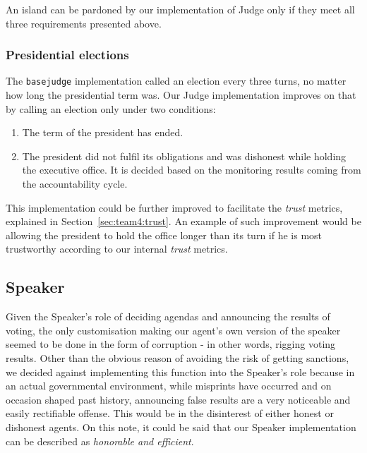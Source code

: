 An island can be pardoned by our implementation of Judge only if they meet all three requirements presented above. 


\subsubsection{Presidential elections}
The \texttt{basejudge} implementation called an election every three turns, no matter how long the presidential term was. Our Judge implementation improves on that by calling an election only under two conditions:
\begin{enumerate}
    \item The term of the president has ended.
    \item The president did not fulfil its obligations and was dishonest while holding the executive office. It is decided based on the monitoring results coming from the accountability cycle.
\end{enumerate}

This implementation could be further improved to facilitate the \emph{trust} metrics, explained in Section~\ref{sec:team4:trust}. An example of such improvement would be allowing the president to hold the office longer than its turn if he is most trustworthy according to our internal \emph{trust} metrics.

\subsection{Speaker}
Given the Speaker's role of deciding agendas and announcing the results of voting, the only customisation making our agent's own version of the speaker seemed to be done in the form of corruption - in other words, rigging voting results. Other than the obvious reason of avoiding the risk of getting sanctions, we decided against implementing this function into the Speaker's role because in an actual governmental environment, while misprints have occurred and on occasion shaped past history, announcing false results are a very noticeable and easily rectifiable offense. This would be in the disinterest of either honest or dishonest agents. On this note, it could be said that our Speaker implementation can be described as \emph{honorable and efficient}.

